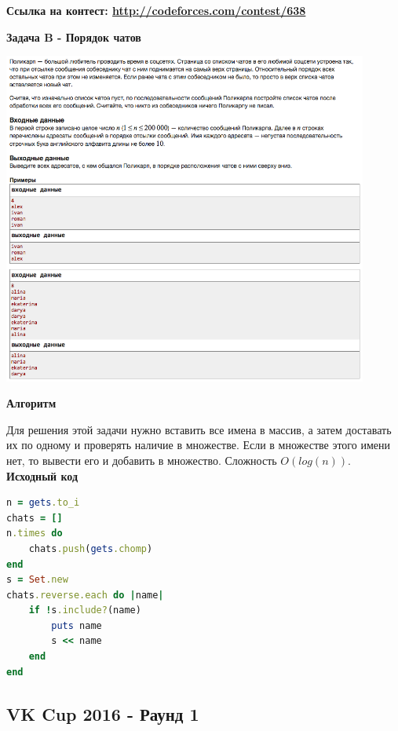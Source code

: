 \documentclass[a4paper,12pt]{article}
\begin{document}
\textbf{{\large Ссылка на контест: \url{http://codeforces.com/contest/638}}}

\newpage
\textbf{{\large Задача B - Порядок чатов}}

\begin{center}
\includegraphics[width=0.9\textwidth]{VK_Q1/B.png}\\ [1cm]
\end{center}

\textbf{{\large Алгоритм}}

Для решения этой задачи нужно вставить все имена в массив, а затем доставать их по одному и проверять наличие в множестве. Если в множестве этого имени нет, то вывести его и добавить в множество. Сложность $O(log(n))$.\\

\textbf{{\large Исходный код}} \\
\begin{lstlisting}[language=Ruby]
n = gets.to_i
chats = []
n.times do
    chats.push(gets.chomp)
end
s = Set.new
chats.reverse.each do |name|
    if !s.include?(name)
        puts name
        s << name
    end
end
\end{lstlisting}



%
%

\newpage
\subsection{VK Cup 2016 - Раунд 1}
\end{document}
